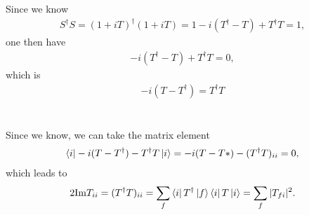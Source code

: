 \documentclass[11pt]{article}
\begin{document}
\section{ }
Since we know
\begin{eqnarray}
    S^\dagger S = (1 + iT)^\dagger (1+iT)
                    = 1 -i(T^\dagger - T) + T^\dagger T
                    = 1 ,
\end{eqnarray}
one then have 
\begin{eqnarray}
    -i(T^\dagger - T) + T^\dagger T=0,
\end{eqnarray}
which is 
\begin{eqnarray}
    -i(T-T^\dagger) = T^\dagger T 
\end{eqnarray}


\section{ }
Since we know, we can take the matrix element
\begin{eqnarray}
    \bra{i} -i(T-T^\dagger) - T^\dagger T \ket{i} = -i(T-T*) - (T^\dagger T)_{ii} =0,
\end{eqnarray}
which leads to 
\begin{eqnarray}
    2{\rm Im}T_{ii}=(T^\dagger T)_{ii} = \sum_{f}\bra{i}T^\dagger \ket{f}\bra{i}T\ket{i} =\sum_f |T_{fi}|^2.
\end{eqnarray}
\end{document}
